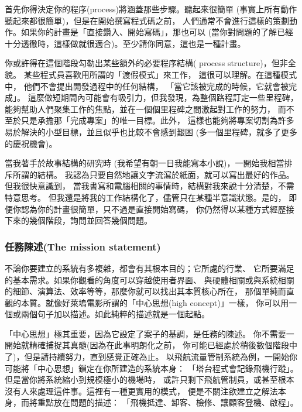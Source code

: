首先你得決定你的程序(process)將涵蓋那些步驟。聽起來很簡單
(事實上所有動作聽起來都很簡單)，但是在開始撰寫程式碼之前，
人們通常不會進行這樣的策劃動作。如果你的計畫是「直接鑽入、開始寫碼」，那也可以
(當你對問題的了解已經十分透徹時，這樣做就很適合)。至少請你同意，這也是一種計畫。

你或許得在這個階段勾勒出某些額外的必要程序結構( process structure)，但非全貌。
某些程式員喜歡用所謂的「渡假模式」來工作， 這很可以理解。在這種模式中，
他們不會提出開發過程中的任何結構， 「當它該被完成的時候，它就會被完成」。
這麼做短期間內可能會有吸引力，但我發現，為整個路程訂定一些里程碑，
能夠幫助人們聚集工作的焦點，並在一個個里程碑之間激起對工作的努力，
而不至於只是承擔那「完成專案」的唯一目標。此外，
這樣也能夠將專案切割為許多易於解決的小型目標，並且似乎也比較不會感到艱困
(多一個里程碑，就多了更多的慶祝機會)。

當我著手於故事結構的研究時
(我希望有朝一日我能寫本小說)，一開始我相當排斥所謂的結構。
我認為只要自然地讓文字流瀉於紙面，就可以寫出最好的作品。但我很快意識到，
當我書寫和電腦相關的事情時，結構對我來說十分清楚，不需特意思考。
但我還是將我的工作結構化了，儘管只在某種半意識狀態。是的，
即便你認為你的計畫很簡單，只不過是直接開始寫碼，
你仍然得以某種方式經歷接下來的幾個階段，詢問並回答幾個問題。
\subsubsection{任務陳述(The mission statement)}

不論你要建立的系統有多複雜，都會有其根本目的；它所處的行業、
它所要滿足的基本需求。如果你觀看的角度可以穿越使用者界面、
與硬體相關或與系統相關的細節、演算法、效率等等，那麼你就可以找出其本質核心所在，
那個單純而直觀的本質。就像好萊塢電影所謂的「中心思想(high concept)」一樣，
你可以用一個或兩個句子加以描述。如此純粹的描述就是一個起點。

「中心思想」極其重要，因為它設定了案子的基調，是任務的陳述。
你不需要一開始就精確捕捉其真髓(因為在此事明朗化之前，
你可能已經處於稍後數個階段中了)，但是請持續努力，直到感覺正確為止。
以飛航流量管制系統為例，一開始你可能將「中心思想」鎖定在你所建造的系統本身：
「塔台程式會記錄飛機行蹤」。但是當你將系統縮小到規模極小的機場時，
或許只剩下飛航管制員，或甚至根本沒有人來處理這件事。這裡有一種更實用的模式，
便是不關注欲建立之解法本身，而將重點放在問題的描述：
「飛機抵達、卸客、檢修、讓顧客登機、啟程」。
